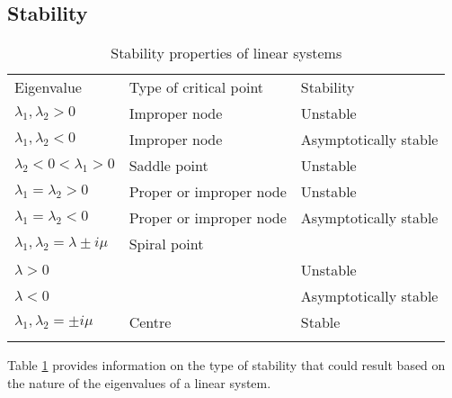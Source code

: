 \documentclass[leqno,DIV=calc,paper=a4,fontsize=11pt]{article}
\theoremstyle{definition}
\theoremstyle{plain}
\theoremstyle{remark}
\begin{document}
\subsection{Stability}
\begin{table}[!htb]
\centering
\caption{Stability properties of linear systems}\label{tab:a}
\begin{tabular}{@{}  l l l @{}}\Xhline{4\arrayrulewidth}
Eigenvalue    & Type of critical point  &  Stability        \\ \Xhline{4\arrayrulewidth}
$\lambda_1,\lambda_2>0$ & Improper node           & Unstable \\
$\lambda_1,\lambda_2<0$ & Improper node           & Asymptotically stable  \\
$\lambda_2<0<\lambda_1>0$ & Saddle point            & Unstable   \\
$\lambda_1=\lambda_2>0$ & Proper or improper node & Unstable  \\
$\lambda_1=\lambda_2<0$ & Proper or improper node & Asymptotically stable \\
$\lambda_1,\lambda_2=\lambda\pm i\mu$ & Spiral point            &   \\
$\lambda>0$  &                         & Unstable \\
$\lambda<0$  &                         & Asymptotically stable  \\
$\lambda_1,\lambda_2=\pm i\mu$ &  Centre                 & Stable  \\
\Xhline{4\arrayrulewidth}
\end{tabular}
\end{table}

Table \ref{tab:a} provides information on the type of stability that could result based on the nature of the eigenvalues of a linear system.
\end{document}
